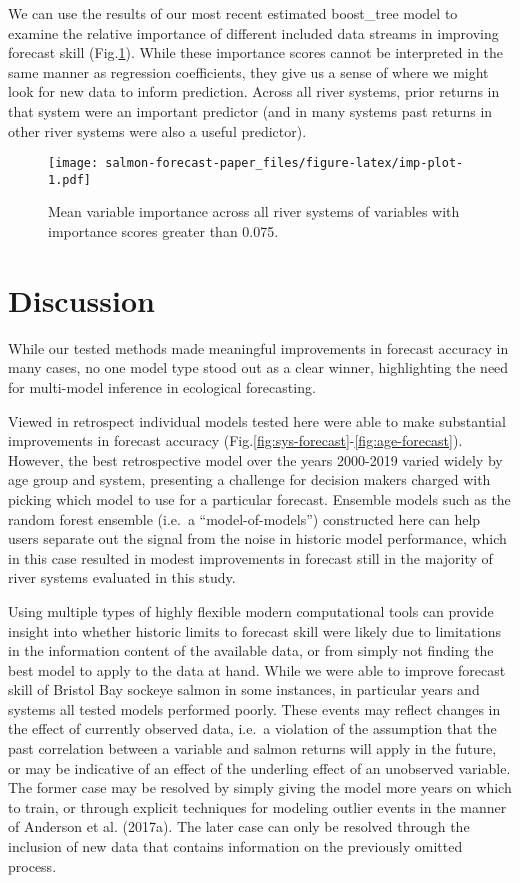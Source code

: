 \documentclass[
]{article}
\begin{document}
We can use the results of our most recent estimated boost\_tree model to examine the relative importance of different included data streams in improving forecast skill (Fig.\ref{fig:imp-plot}). While these importance scores cannot be interpreted in the same manner as regression coefficients, they give us a sense of where we might look for new data to inform prediction. Across all river systems, prior returns in that system were an important predictor (and in many systems past returns in other river systems were also a useful predictor).

\begin{figure}
\centering
\texttt{[image: salmon-forecast-paper\_files/figure-latex/imp-plot-1.pdf]}
\caption{\label{fig:imp-plot}Mean variable importance across all river systems of variables with importance scores greater than 0.075.}
\end{figure}

\hypertarget{discussion}{%
\section*{Discussion}\label{discussion}}

While our tested methods made meaningful improvements in forecast accuracy in many cases, no one model type stood out as a clear winner, highlighting the need for multi-model inference in ecological forecasting.

Viewed in retrospect individual models tested here were able to make substantial improvements in forecast accuracy (Fig.\ref{fig:sys-forecast}-\ref{fig:age-forecast}). However, the best retrospective model over the years 2000-2019 varied widely by age group and system, presenting a challenge for decision makers charged with picking which model to use for a particular forecast. Ensemble models such as the random forest ensemble (i.e.~a ``model-of-models'') constructed here can help users separate out the signal from the noise in historic model performance, which in this case resulted in modest improvements in forecast still in the majority of river systems evaluated in this study.

Using multiple types of highly flexible modern computational tools can provide insight into whether historic limits to forecast skill were likely due to limitations in the information content of the available data, or from simply not finding the best model to apply to the data at hand. While we were able to improve forecast skill of Bristol Bay sockeye salmon in some instances, in particular years and systems all tested models performed poorly. These events may reflect changes in the effect of currently observed data, i.e.~a violation of the assumption that the past correlation between a variable and salmon returns will apply in the future, or may be indicative of an effect of the underling effect of an unobserved variable. The former case may be resolved by simply giving the model more years on which to train, or through explicit techniques for modeling outlier events in the manner of Anderson et al. (2017a). The later case can only be resolved through the inclusion of new data that contains information on the previously omitted process.
\end{document}
